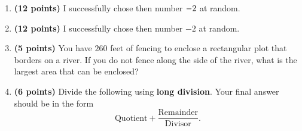 \documentclass[12pt]{amsart}
\begin{document}
\begin{enumerate}
\item {\bf (12 points)} 
 I successfully chose then number $\atwotwo$ at random. 
\vfill 
\def \a{7}\def \atwoone{3}\def \atwotwo{-2}\def \atwothree{1}\def \btwothree{6}\def \sumtwothree{7}\def \diftwothree{-5}\def \bigtwothree{100}\def \powtwothree{6}\def \logtwothree{0.0}\def \factortwothree{85}\def \atwofour{1.56}\def \btwofour{1.532}\def \tooshorttwofour{10.1}\def \moneytwofour{10.10}\def \longertwofour{10.10000}\def \atwofive{0.12}\def \btwofive{0.12346}\def \athreeone{5}\def \bthreeone{7}\def \setthreetwo{[12, 6, 9]}\def \athreetwo{12}\def \bthreetwo{6}\def \cthreetwo{9}\def \controlthreethree{5}\def \athreethree{3}\def \topthreethree{1}\def \athreefour{4}\def \bthreefour{2}\def \listthreefour{[1, 2, 3, 5]}\def \afourone{8}\def \bfourone{-8}\def \fracfourone{-1}\def \rootfourtwo{8}\def \simplifiedfourtwo{2 \sqrt{2}}\def \sqrtlistfourtwo{[2, 2]}\def \outfourtwo{2}\def \infourtwo{2}\def \wowfourtwo{1}\def \afourthree{0}\def \nicethreefour{3x^{2}-x^{}}\def \nastythreefour{xyz^{3}}\def \cfourthree{-4}\def \dfourthree{-9}\def \infourthree{-4x^{}}\def \outfourthree{-9y^{}}\def \afourfour{1848409}\def \nicefourfour{1,848,409}\def \goodfourfour{1,000,000.12345}\def \badfourfour{1,000,000.1}
\item {\bf (12 points)} 
 I successfully chose then number $\atwotwo$ at random. 
\vfill 
\newpage\def \x{65}\def \y{130}\def \L{260}\def \area{8450}
\item {\bf (5 points)} 
 You have $\L$ feet of fencing to enclose a rectangular plot that borders on a river. If you do not fence along the side of the river, what is the largest area that can be enclosed? \\

  
\vfill \vfill \vfill
\def \a{4}\def \b{2}\def \c{-6}\def \r{11}\def \monicpol{x^{}+4}\def \longnbad{2x^{2}+2x^{}-13}\def \anspol{2x^{}-6}
\item {\bf (6 points)} 
 Divide the following using {\bf long division}. Your final answer should be in the form $$ \text{Quotient} + \dfrac{\text{Remainder}}{\text{Divisor}}.$$

\vspace{3mm}


\end{enumerate}
\end{document}
